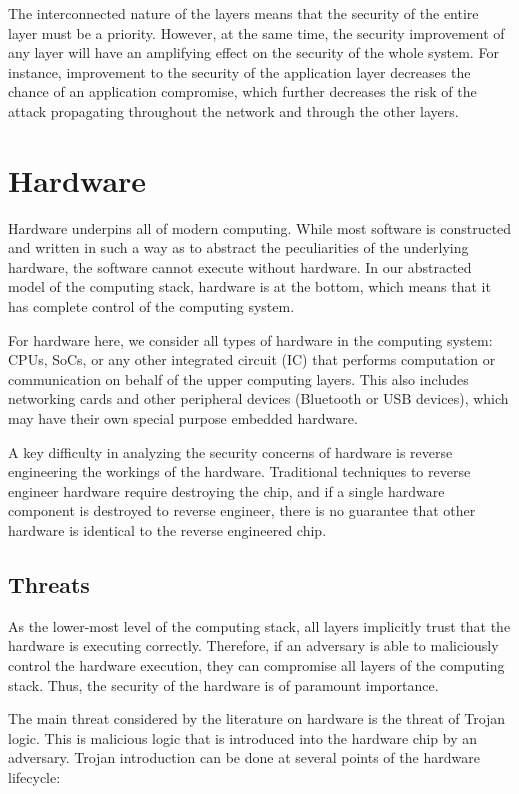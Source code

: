 \documentclass[11pt,letterpaper]{article}
\begin{document}
The interconnected nature of the layers means that the security of the
entire layer must be a priority. However, at the same time, the
security improvement of any layer will have an amplifying effect on
the security of the whole system. For instance, improvement to the
security of the application layer decreases the chance of an
application compromise, which further decreases the risk of the attack
propagating throughout the network and through the other layers.

\section{Hardware}

Hardware underpins all of modern computing. While most software is
constructed and written in such a way as to abstract the
peculiarities of the underlying hardware, the software cannot
execute without hardware. In our abstracted model of the computing
stack, hardware is at the bottom, which means that it has complete
control of the computing system.

For hardware here, we consider all types of hardware in the computing
system: CPUs, SoCs, or any other integrated circuit (IC) that performs
computation or communication on behalf of the upper computing layers.
This also includes networking cards and other peripheral devices
(Bluetooth or USB devices), which may have their own special purpose
embedded hardware.

A key difficulty in analyzing the security concerns of hardware is
reverse engineering the workings of the hardware. Traditional
techniques to reverse engineer hardware require destroying the chip,
and if a single hardware component is destroyed to reverse engineer,
there is no guarantee that other hardware is identical to the reverse
engineered chip.

\subsection{Threats}

As the lower-most level of the computing stack, all layers implicitly
trust that the hardware is executing correctly. Therefore, if an
adversary is able to maliciously control the hardware execution, they
can compromise all layers of the computing stack. Thus, the security
of the hardware is of paramount importance.

The main threat considered by the literature on hardware is the threat
of Trojan logic. This is malicious logic that is introduced into the
hardware chip by an adversary. Trojan introduction can be
done at several points of the hardware lifecycle:
\end{document}

